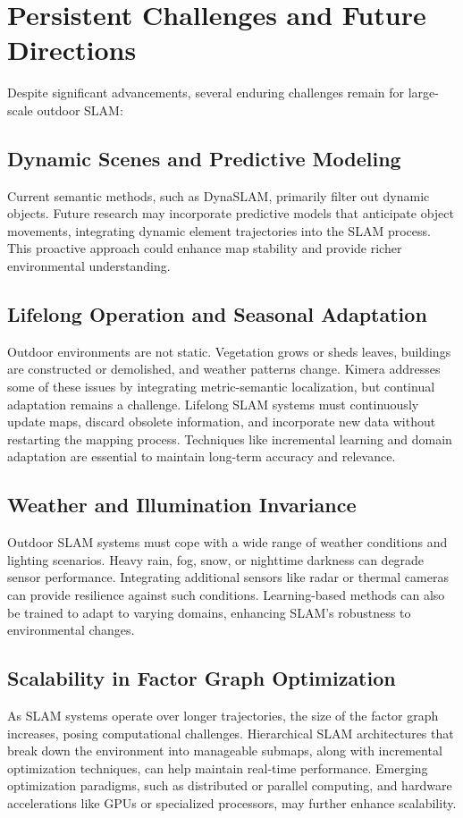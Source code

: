 \documentclass[conference]{IEEEtran}
\begin{document}
\section{Persistent Challenges and Future Directions}
Despite significant advancements, several enduring challenges remain for large-scale outdoor SLAM:

\subsection{Dynamic Scenes and Predictive Modeling}
Current semantic methods, such as DynaSLAM, primarily filter out dynamic objects. Future research may incorporate predictive models that anticipate object movements, integrating dynamic element trajectories into the SLAM process. This proactive approach could enhance map stability and provide richer environmental understanding.

\subsection{Lifelong Operation and Seasonal Adaptation}
Outdoor environments are not static. Vegetation grows or sheds leaves, buildings are constructed or demolished, and weather patterns change. Kimera \cite{11} addresses some of these issues by integrating metric-semantic localization, but continual adaptation remains a challenge. Lifelong SLAM systems must continuously update maps, discard obsolete information, and incorporate new data without restarting the mapping process. Techniques like incremental learning and domain adaptation are essential to maintain long-term accuracy and relevance.

\subsection{Weather and Illumination Invariance}
Outdoor SLAM systems must cope with a wide range of weather conditions and lighting scenarios. Heavy rain, fog, snow, or nighttime darkness can degrade sensor performance. Integrating additional sensors like radar or thermal cameras can provide resilience against such conditions. Learning-based methods can also be trained to adapt to varying domains, enhancing SLAM’s robustness to environmental changes.

\subsection{Scalability in Factor Graph Optimization}
As SLAM systems operate over longer trajectories, the size of the factor graph increases, posing computational challenges. Hierarchical SLAM architectures that break down the environment into manageable submaps, along with incremental optimization techniques, can help maintain real-time performance. Emerging optimization paradigms, such as distributed or parallel computing, and hardware accelerations like GPUs or specialized processors, may further enhance scalability.
\end{document}
